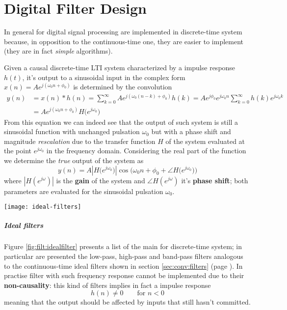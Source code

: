 \chapter{Digital Filter Design} \label{sec:digitalfilterdesign}
	In general  for digital signal processing are implemented in discrete-time system because, in opposition to the continuous-time one, they are easier to implement (they are in fact \textit{simple} algorithms).
	
	Given a causal discrete-time LTI system characterized by a impulse response $h(t)$, it's output to a sinusoidal input in the complex form $x(n) = A e^{j(\omega_0n+\phi_0)}$ is determined by the convolution
	\begin{equation} \label{eq:filt:shift}
	\begin{aligned} 
		y(n) & = x(n) * h(n) = \sum_{k=0}^\infty A e^{j(\omega_0(n-k)+\phi_0)}h(k) = Ae^{j\phi_0} e^{j\omega_0n} \sum_{k=0}^\infty h(k) e^{j\omega_0k} \\
		& = A e^{j(\omega_0n + \phi_0)}H\big(e^{j\omega_0}\big)
	\end{aligned}
	\end{equation}
	From this equation we can indeed see that the output of such system is still a sinusoidal function with unchanged pulsation $\omega_0$ but with a phase shift and magnitude \textit{rescalation} due to the transfer function $H$ of the system evaluated at the point $e^{j\omega_0}$ in the frequency domain. Considering the real part of the function we determine the \textit{true} output of the system as
	\[ y(n) = A \left| H\big(e^{j\omega_0}\big) \right| \cos\Big( \omega_0n + \phi_0 + \angle H\big(e^{j\omega_0}\big) \Big) \]
	where $|H(e^{j\omega})|$ is the \textbf{gain} of the system and $\angle H(e^{j\omega})$ it's \textbf{phase shift}; both parameters are evaluated for the sinusoidal pulsation $\omega_0$.	
	
	\begin{SCfigure}[2][bt]
		\centering \texttt{[image: ideal-filters]}
		\caption{examples of ideal filters in the frequency domain.}
		\label{fig:filt:idealfilter}
	\end{SCfigure}

	\paragraph{Ideal filters} Figure \ref{fig:filt:idealfilter} presents a list of the main  for discrete-time system; in particular are presented the low-pass, high-pass and band-pass filters analogous to the continuous-time ideal filters shown in section \ref{sec:conv:filters} (page \pageref{sec:conv:filters}). In practise filter with such frequency response cannot be implemented due to their \textbf{non-causality}: this kind of filters implies in fact a impulse response
	\[ h(n) \neq 0 \qquad \textrm{for } n < 0 \]
	meaning that the output should be affected by inputs that still hasn't committed.
	
